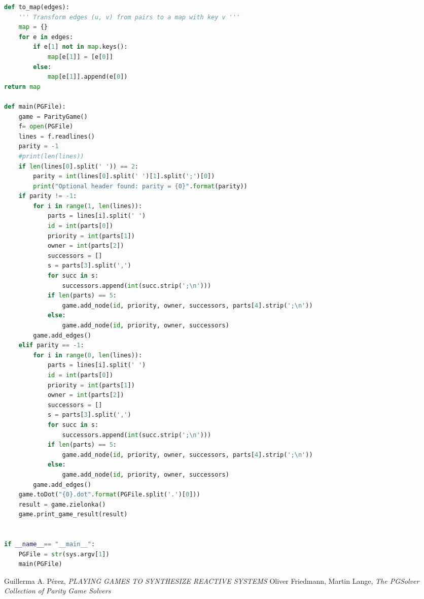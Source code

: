 \documentclass[12pt]{article}
\begin{document}
\begin{lstlisting}[language=python]
def to_map(edges):
	''' Transform edges (u, v) from pairs to a map with key v '''
	map = {}
	for e in edges:
		if e[1] not in map.keys():
			map[e[1]] = [e[0]]
		else:
			map[e[1]].append(e[0])
return map

def main(PGFile):
	game = ParityGame()
	f= open(PGFile)
	lines = f.readlines()
	parity = -1
	#print(len(lines))
	if len(lines[0].split(' ')) == 2:
		parity = int(lines[0].split(' ')[1].split(';')[0])
		print("Optional header found: parity = {0}".format(parity))
	if parity != -1:
		for i in range(1, len(lines)):
			parts = lines[i].split(' ')
			id = int(parts[0])
			priority = int(parts[1])
			owner = int(parts[2])
			successors = []
			s = parts[3].split(',')
			for succ in s:
				successors.append(int(succ.strip(';\n')))
			if len(parts) == 5:
				game.add_node(id, priority, owner, successors, parts[4].strip(';\n'))
			else:
				game.add_node(id, priority, owner, successors)
		game.add_edges()
	elif parity == -1:
		for i in range(0, len(lines)):
			parts = lines[i].split(' ')
			id = int(parts[0])
			priority = int(parts[1])
			owner = int(parts[2])
			successors = []
			s = parts[3].split(',')
			for succ in s:
				successors.append(int(succ.strip(';\n')))
			if len(parts) == 5:
				game.add_node(id, priority, owner, successors, parts[4].strip(';\n'))
			else:
				game.add_node(id, priority, owner, successors)
		game.add_edges()
	game.toDot("{0}.dot".format(PGFile.split('.')[0]))
	result = game.zielonka()
	game.print_game_result(result)


if __name__== "__main__":
	PGFile = str(sys.argv[1])
	main(PGFile)

\end{lstlisting}


\newpage
\begin{thebibliography}{9}
	
	Guillerma A. Pérez,
	\textit{PLAYING GAMES TO SYNTHESIZE REACTIVE SYSTEMS}
	Oliver Friedmann, Martin Lange,
	\textit{The PGSolver Collection of Parity Game Solvers}
	
\end{thebibliography}
\end{document}
